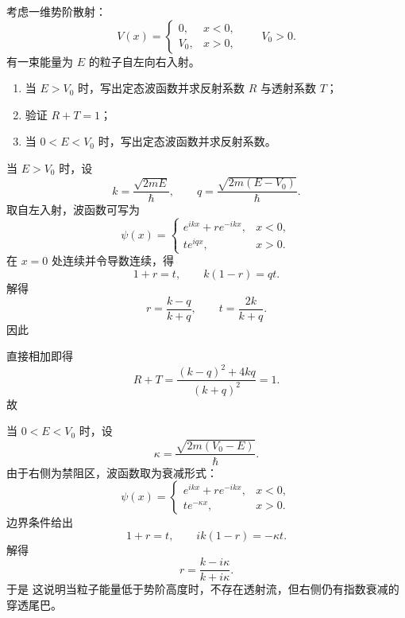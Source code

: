 \begin{question}
考虑一维势阶散射：
\[
V(x)=
\begin{cases}
0,& x<0,\\
V_0,& x>0,
\end{cases}
\qquad V_0>0.
\]
有一束能量为 $E$ 的粒子自左向右入射。

\begin{enumerate}[label=(\arabic*),leftmargin=2.5em]
  \item 当 $E>V_0$ 时，写出定态波函数并求反射系数 $R$ 与透射系数 $T$；
  \item 验证 $R+T=1$；
  \item 当 $0<E<V_0$ 时，写出定态波函数并求反射系数。
\end{enumerate}

\begin{solution}
当 $E>V_0$ 时，设
\[
k=\frac{\sqrt{2mE}}{\hbar},
\qquad
q=\frac{\sqrt{2m(E-V_0)}}{\hbar}.
\]
取自左入射，波函数可写为
\[
\psi(x)=
\begin{cases}
e^{ikx}+r e^{-ikx},& x<0,\\
t e^{iqx},& x>0.
\end{cases}
\]
在 $x=0$ 处连续并令导数连续，得
\[
1+r=t,
\qquad
k(1-r)=qt.
\]
解得
\[
r=\frac{k-q}{k+q},
\qquad
t=\frac{2k}{k+q}.
\]
因此

直接相加即得
\[
R+T=\frac{(k-q)^2+4kq}{(k+q)^2}=1.
\]
故

当 $0<E<V_0$ 时，设
\[
\kappa=\frac{\sqrt{2m(V_0-E)}}{\hbar}.
\]
由于右侧为禁阻区，波函数取为衰减形式：
\[
\psi(x)=
\begin{cases}
e^{ikx}+r e^{-ikx},& x<0,\\
t e^{-\kappa x},& x>0.
\end{cases}
\]
边界条件给出
\[
1+r=t,
\qquad
ik(1-r)=-\kappa t.
\]
解得
\[
r=\frac{k-i\kappa}{k+i\kappa}.
\]
于是
这说明当粒子能量低于势阶高度时，不存在透射流，但右侧仍有指数衰减的穿透尾巴。
\end{solution}
\end{question}

